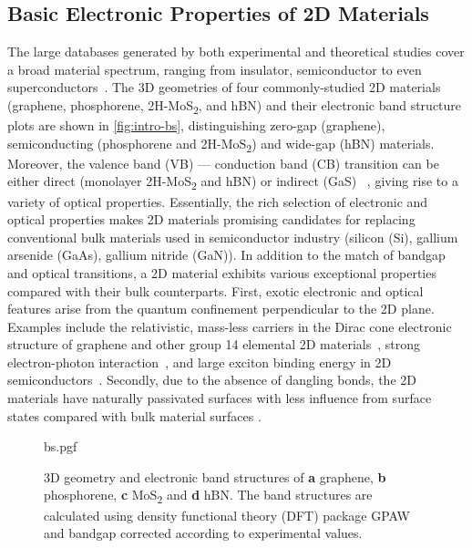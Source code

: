 \subsection{Basic Electronic Properties of 2D Materials}
\label{sec:basic-electr-prop}

The large databases generated by both
experimental and theoretical studies cover a broad material spectrum,
ranging from insulator, semiconductor to even
superconductors~\autocite{Novoselov_2016_vdW}.
%
The 3D geometries of four commonly-studied 2D materials (graphene,
phosphorene, 2H-MoS\textsubscript{2}, and hBN) and their electronic
band structure plots are shown in \autoref{fig:intro-bs}, distinguishing
zero-gap (graphene), semiconducting (phosphorene and
2H-MoS\textsubscript{2}) and wide-gap (hBN) materials.
%
Moreover, the valence band (VB) — conduction band (CB) transition can
be either direct (monolayer 2H-MoS\textsubscript{2} and hBN) or
indirect (GaS) ~\autocite{Xia_2014_2D_nanophoto_rev}, giving rise to a
variety of optical properties.
%
Essentially, the rich selection of electronic and optical properties
makes 2D materials promising candidates for replacing conventional
bulk materials used in semiconductor industry (\eg silicon (Si),
gallium arsenide (GaAs), gallium nitride (GaN)).
%
In addition to the match of bandgap and optical transitions, a 2D
material exhibits various exceptional properties compared with their
bulk counterparts.
%
First, exotic electronic and optical features arise from the quantum
confinement perpendicular to the 2D plane.
%
Examples include the relativistic, mass-less carriers in the Dirac
cone electronic structure of graphene and other group 14 elemental 2D
materials~\autocite{Novoselov_2005_massless,Zhang_2005_QHE,Das_Sarma_2011_electron_gr},
strong electron-photon
interaction~\autocite{Nair_2008_transparent,Eda_2013_rev_opt}, and large
exciton binding energy in 2D
semiconductors~\autocite{Mak_2010_mos2,Arnaud_2006_exc_hBN}.
%
Secondly, due to the absence of dangling bonds, the 2D materials have
naturally passivated surfaces with less influence from surface states
compared with bulk material surfaces
\autocite{Novoselov_2016_vdW,Liu_2016_rev}.


\begin{figure}[!htbp]
  \centering
  {bs.pgf}
  \caption{\label{fig:intro-bs} %
    3D geometry and electronic band structures of \textbf{a} graphene,
    \textbf{b} phosphorene, \textbf{c} MoS\textsubscript{2} and
    \textbf{d} hBN. The band structures are calculated using density
    functional theory (DFT) package GPAW~\autocite{Mortensen_2005_gpaw}
    and bandgap corrected according to experimental values.}
\end{figure}

